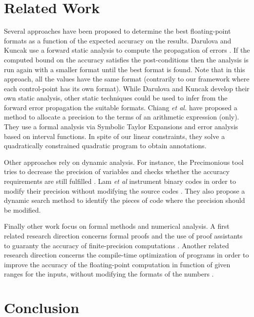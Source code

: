 
\section{Related Work}
\label{relate}

Several approaches have been proposed to determine the best floating-point formats  as a function of the
expected accuracy on the results. Darulova and Kuncak use a forward static analysis to compute the propagation of errors
\cite{DK14}. If the computed bound on the accuracy satisfies the post-conditions then the analysis is
run again with a smaller format until the best format is found. Note that in this approach, all the values have
the same format (contrarily to our framework where each control-point has its own format).
While Darulova and Kuncak develop their own static analysis, other static techniques \cite{Gou13,Sal15} could be used to
infer from the forward error propagation the suitable formats. 
Chiang \textit{et al.} \cite{Call17} have proposed a method to allocate a precision to the terms of an arithmetic expression (only).
They use a formal analysis via Symbolic Taylor Expansions and
error analysis based on interval functions. 
In spite of our linear constraints, they solve a quadratically constrained quadratic program to obtain
 annotations.

Other approaches rely on dynamic analysis. For instance, the Precimonious tool tries to decrease the precision
of variables and checks whether the accuracy requirements are still fulfilled \cite{Nal16,Ral13}.
Lam \textit{et al} instrument binary codes in order to modify their precision without modifying the
source codes \cite{Lal13}. They also propose a dynamic search method to identify the pieces of code where the precision
should be modified.

Finally other work focus on formal methods and numerical analysis.
A first related research direction concerns formal proofs and the use of proof assistants to guaranty
the accuracy of finite-precision computations \cite{Bol15,Har07,Lee18}.
Another related research direction concerns the  compile-time optimization of programs in order to improve
the accuracy of the floating-point computation in function of given ranges for the inputs, without
modifying the formats of the numbers \cite{DMC15,Pal15}.

\section{Conclusion}
\label{conc}

